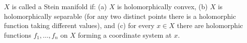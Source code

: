 $X$ is called a Stein manifold if: (a) $X$ is holomorphically convex, (b) $X$ is holomorphically separable (for any two distinct points there is a holomorphic function taking different values), and (c) for every $x \in X$ there are holomorphic functions $f_1, \ldots, f_n$ on $X$ forming a coordinate system at $x$.
